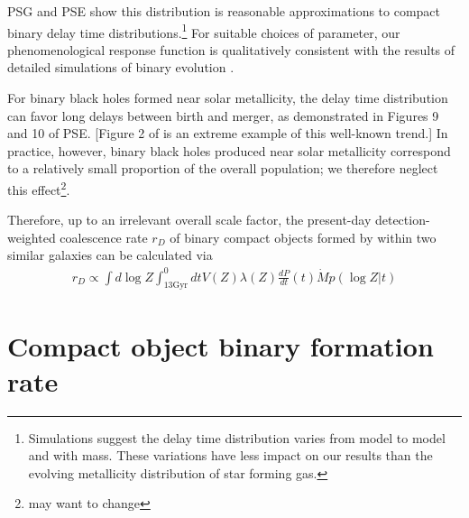 \documentclass[nofootinbib,twocolumn,prd]{emulateapj}
\newcommand\unit[1]{\text{#1}}
\newcommand\abbrvPSgrb{PSG}
\newcommand\abbrvPSellipticals{PSE}
\begin{document}
\abbrvPSgrb{} and \abbrvPSellipticals{} show this distribution is reasonable approximations to compact binary delay
time distributions.\footnote{Simulations suggest the delay time distribution varies from model to model and with mass.
  These variations have less impact on our results than the evolving metallicity distribution of star forming gas.}
%
For suitable choices of parameter, our phenomenological response function is qualitatively consistent with the results of detailed simulations of binary
evolution  \citep{2010ApJ...715L.138B,popsyn-LowMetallicityImpact2c-StarTrackRevised-2014,popsyn-LowMetallicityImpact2b-StarTrackRevised-2013,popsyn-LowMetallicityImpact2-StarTrackRevised-2012}.


For binary black holes formed near solar metallicity, the delay time distribution can favor long delays between birth
and merger, as demonstrated in Figures 9 and 10 of \abbrvPSellipticals{}.  [Figure 2 of  \cite{2016arXiv160508783L} is
  an extreme example of this well-known trend.]  In practice, however, binary black holes produced near solar
metallicity correspond to a relatively small proportion of the overall population; we therefore neglect this
effect\footnote{may want to change}.


Therefore, up to an irrelevant overall scale factor, the  present-day detection-weighted coalescence rate $r_D$  of binary compact objects formed by within two similar
galaxies  can be calculated via
\begin{eqnarray}
 r_D \propto  \int d\log Z  \int _{13 \unit{Gyr}}^0dt  V(Z) \lambda(Z) \frac{dP}{dt}(t) \dot{M} p(\log Z|t)
\end{eqnarray}


\section{Compact object binary formation rate}
\label{sec:results:BBH}
\end{document}
